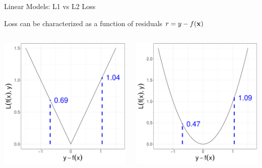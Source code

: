 \documentclass[11pt,compress,t,notes=noshow, xcolor=table]{beamer}
\begin{document}
\begin{vbframe}{Linear Models: L1 vs L2 Loss}

\small Loss can be characterized as a function of residuals \textbf{$r = y - f(\mathbf{x})$}

\begin{columns}  
\begin{column}{0.4\textwidth} 
\begin{center}
  \includegraphics[width = \textwidth]{figure/nutshell-regression-L1.pdf}
\end{center}
\end{column}
\begin{column}{0.4\textwidth} 
\begin{center}
  \includegraphics[width = \textwidth]{figure/nutshell-regression-L2.pdf}

\end{center}
\end{column}
\end{columns}
\end{vbframe}
\end{document}
